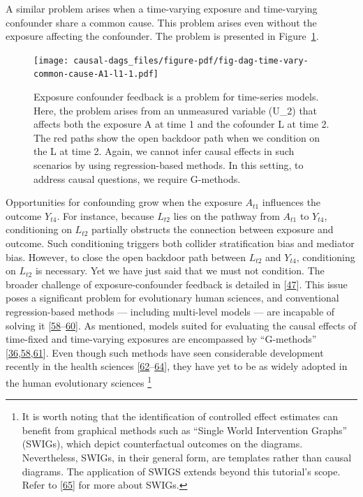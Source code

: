 \documentclass[
  singlecolumn]{article}
\begin{document}
A similar problem arises when a time-varying exposure and time-varying
confounder share a common cause. This problem arises even without the
exposure affecting the confounder. The problem is presented in
Figure~\ref{fig-dag-time-vary-common-cause-A1-l1}.

\begin{figure}

{\centering \texttt{[image: causal-dags\_files/figure-pdf/fig-dag-time-vary-common-cause-A1-l1-1.pdf]}

}

\caption{\label{fig-dag-time-vary-common-cause-A1-l1}Exposure confounder
feedback is a problem for time-series models. Here, the problem arises
from an unmeasured variable (U\_2) that affects both the exposure A at
time 1 and the cofounder L at time 2. The red paths show the open
backdoor path when we condition on the L at time 2. Again, we cannot
infer causal effects in such scenarios by using regression-based
methods. In this setting, to address causal questions, we require
G-methods.}

\end{figure}

Opportunities for confounding grow when the exposure \(A_{t1}\)
influences the outcome \(Y_{t4}\). For instance, because \(L_{t2}\) lies
on the pathway from \(A_{t1}\) to \(Y_{t4}\), conditioning on \(L_{t2}\)
partially obstructs the connection between exposure and outcome. Such
conditioning triggers both collider stratification bias and mediator
bias. However, to close the open backdoor path between \(L_{t2}\) and
\(Y_{t4}\), conditioning on \(L_{t2}\) is necessary. Yet we have just
said that we must not condition. The broader challenge of
exposure-confounder feedback is detailed in
{[}\protect\hyperlink{ref-hernuxe1n2023a}{47}{]}. This issue poses a
significant problem for evolutionary human sciences, and conventional
regression-based methods --- including multi-level models --- are
incapable of solving it
{[}\protect\hyperlink{ref-hernuxe1n2006}{58}--\protect\hyperlink{ref-robins1986}{60}{]}.
As mentioned, models suited for evaluating the causal effects of
time-fixed and time-varying exposures are encompassed by ``G-methods''
{[}\protect\hyperlink{ref-chatton2020}{36},\protect\hyperlink{ref-hernuxe1n2006}{58},\protect\hyperlink{ref-naimi2017}{61}{]}.
Even though such methods have seen considerable development recently in
the health sciences
{[}\protect\hyperlink{ref-williams2021}{62}--\protect\hyperlink{ref-breskin2020}{64}{]},
they have yet to be as widely adopted in the human evolutionary sciences
\footnote{It is worth noting that the identification of controlled
  effect estimates can benefit from graphical methods such as ``Single
  World Intervention Graphs'' (SWIGs), which depict counterfactual
  outcomes on the diagrams. Nevertheless, SWIGs, in their general form,
  are templates rather than causal diagrams. The application of SWIGS
  extends beyond this tutorial's scope. Refer to
  {[}\protect\hyperlink{ref-richardson2013}{65}{]} for more about SWIGs.}
\end{document}
